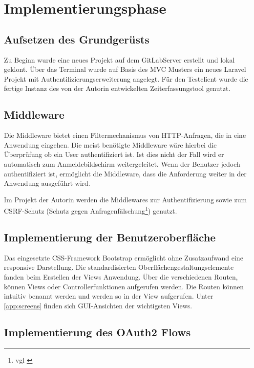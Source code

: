 \section{Implementierungsphase} 
\label{sec:Implementierungsphase}

\subsection{Aufsetzen des Grundgerüsts}
\label{sec:AufsetzenGrundgeruest}

Zu Beginn wurde eine neues Projekt auf dem GitLabServer erstellt und lokal geklont. Über das Terminal wurde auf Basis des MVC Musters ein neues Laravel Projekt mit Authentifizierungserweiterung angelegt. 
Für den Testclient wurde die fertige Instanz des von der Autorin entwickelten Zeiterfassungstool genutzt.

\subsection{Middleware}
\label{sec:Middleware}
Die Middleware bietet einen Filtermechanismus von HTTP-Anfragen, die in eine Anwendung eingehen. Die meist benötigte Middleware wäre hierbei die Überprüfung ob ein User authentifiziert ist. Ist dies nicht der Fall wird er automatisch zum Anmeldebildschirm weitergeleitet. Wenn der Benutzer jedoch authentifiziert ist, ermöglicht die Middleware, dass die Anforderung weiter in der Anwendung ausgeführt wird.

Im Projekt der Autorin werden die Middlewares zur Authentifizierung sowie zum \acs{CSRF}-Schutz (Schutz gegen Anfragenfälschung\footnote{vgl \cite{CSRF}}) genutzt.

\subsection{Implementierung der Benutzeroberfläche}
\label{sec:ImplBenutzeroberflaeche}

Das eingesetzte CSS-Framework Bootstrap ermöglicht ohne Zusatzaufwand eine responsive Darstellung. Die standardisierten Oberflächengestaltungselemente fanden beim Erstellen der Views Anwendung. 
Über die verschiedenen Routen, können Views oder Controllerfunktionen aufgerufen werden. Die Routen können intuitiv benannt werden und werden so in der View aufgerufen.
Unter \ref{app:screens} finden sich GUI-Ansichten der wichtigsten Views.

\subsection{Implementierung des OAuth2 Flows}
\label{sec:ImplementierungOAuth2}

